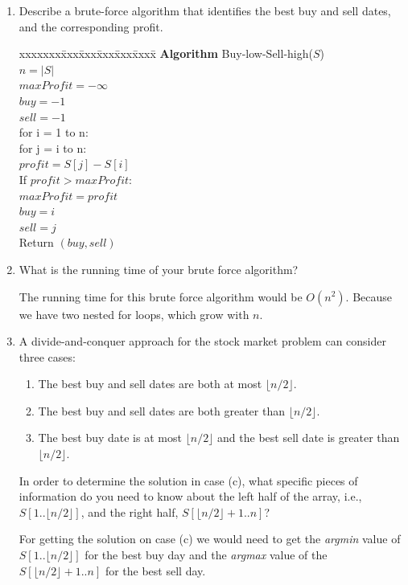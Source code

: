 \documentclass[11pt]{article}
\def\question#1{\red{#1}}
\def\soln#1{\par\blu{#1}} %
\def\blu#1{{\color{blu}#1}}
\def\red#1{{\color{red}#1}}
\begin{document}
\begin{enumerate}
\item \question{Describe a brute-force algorithm that identifies the best buy and sell dates, and the corresponding profit.}
\soln{
  \begin{tabbing}
  xxxxxxx\=xxx\=xxx\=xxx\=xxx\=xxxx\= \kill
  \> {\bf Algorithm} Buy-low-Sell-high($S$) \\
  \>\> $n = |S|$ \\
  \>\> $maxProfit = -\infty$ \\
  \>\> $buy = -1$ \\
  \>\> $sell = -1$ \\
  \>\> for i = 1 to n: \\
  \>\>\> for j = i to n: \\
  \>\>\>\> $profit = S[j] - S[i]$ \\
  \>\>\>\> If $profit > maxProfit:$ \\
  \>\>\>\>\> $maxProfit = profit$ \\
  \>\>\>\>\> $buy = i$ \\
  \>\>\>\>\> $sell = j$ \\
  \>\> Return $(buy, sell)$
  \end{tabbing}
}

\item \question{What is the running time of your brute force algorithm?}
\soln{
  The running time for this brute force algorithm would be $O(n^2)$. Because we have two nested for loops, 
  which grow with $n$.
}

\item A divide-and-conquer approach for the stock market problem can consider three cases:

\begin{enumerate}
\item The best buy and sell dates are both at most $\lfloor n/2 \rfloor$.
\item The best buy and sell dates are both greater than $\lfloor n/2 \rfloor$.
\item The best buy date is at most $\lfloor n/2 \rfloor$ and the best sell date
      is greater than $\lfloor n/2 \rfloor$.
\end{enumerate}

In order to determine the solution in case (c), \question{what specific pieces of information do you need to know about the left half of the array, i.e., $S[1..\lfloor n/2 \rfloor]$, and the right half, $S[\lfloor n/2 \rfloor+1.. n]$?}
\soln{
  For getting the solution on case (c) we would need to get the \emph{argmin} value of 
  $S[1..\lfloor n/2 \rfloor]$ for the best buy day and the \emph{argmax} value of the 
  $S[\lfloor n/2 \rfloor+1 .. n]$ for the best sell day.
}


\end{enumerate}
\end{document}
